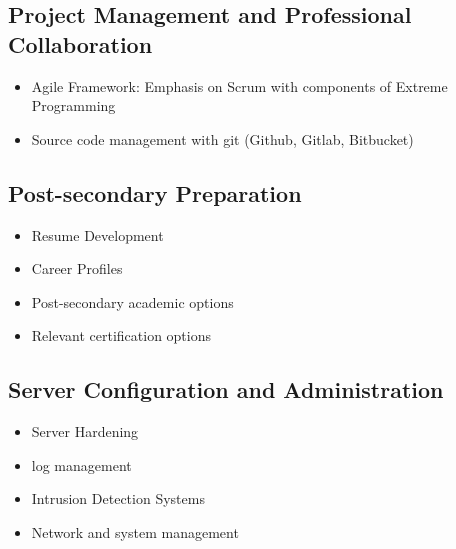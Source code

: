 \documentclass[letterpaper,10pt,english]{sphinxmanual}
\begin{document}
\subsection{Project Management and Professional Collaboration}
\label{cybersecurity:project-management-and-professional-collaboration}\begin{itemize}
\item {} 
Agile Framework: Emphasis on Scrum with components of Extreme Programming

\item {} 
Source code management with git (Github, Gitlab, Bitbucket)

\end{itemize}


\subsection{Post-secondary Preparation}
\label{cybersecurity:post-secondary-preparation}\begin{itemize}
\item {} 
Resume Development

\item {} 
Career Profiles

\item {} 
Post-secondary academic options

\item {} 
Relevant certification options

\end{itemize}


\subsection{Server Configuration and Administration}
\label{cybersecurity:server-configuration-and-administration}\begin{itemize}
\item {} 
Server Hardening

\item {} 
log management

\item {} 
Intrusion Detection Systems

\item {} 
Network and system management

\end{itemize}
\end{document}
